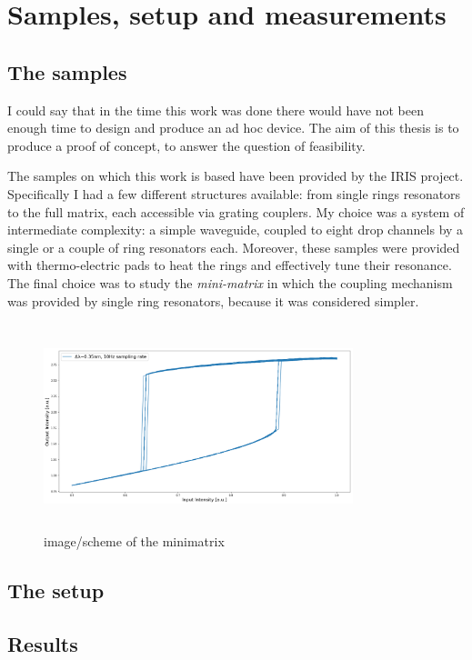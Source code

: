 \chapter{Samples, setup and measurements}

\section{The samples}
I could say that in the time this work was done there would have not been enough time to design and produce an ad hoc device. The aim of this thesis is to produce a proof of concept, to answer the question of feasibility.
\vspace{1em}

The samples on which this work is based have been provided by the IRIS project.
Specifically I had a few different structures available: from single rings resonators to the full matrix, each accessible via grating couplers.
My choice was a system of intermediate complexity: a simple waveguide, coupled to eight drop channels by a single or a couple of ring resonators each.
Moreover, these samples were provided with thermo-electric pads to heat the rings and effectively tune their resonance.
The final choice was to study the \textit{mini-matrix} in which the coupling mechanism was provided by single ring resonators, because it was considered simpler.

\begin{figure}[ht]
	\centering
	\includegraphics[draft,width=9cm,height=6cm]{figures/foo.png}
	\caption{image/scheme of the minimatrix}
	\label{fig:minimatrix_full}
\end{figure}

\section{The setup}

\section{Results}
